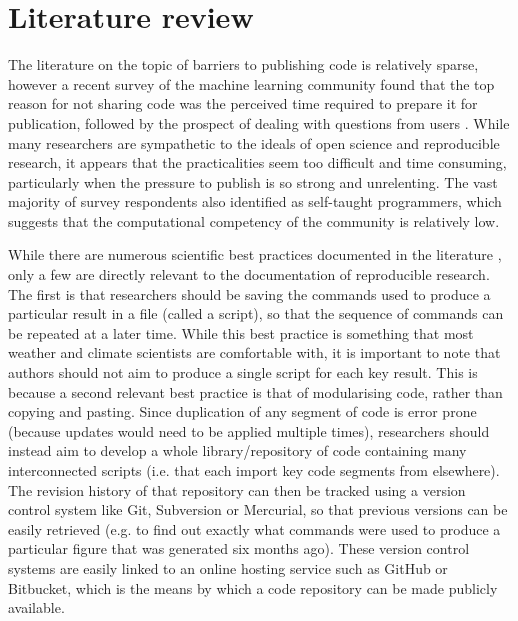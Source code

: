 
\section{Literature review}\label{s:reproducibility_review}

The literature on the topic of barriers to publishing code is relatively sparse, however a recent survey of the machine learning community found that the top reason for not sharing code was the perceived time required to prepare it for publication, followed by the prospect of dealing with questions from users \citep{Stodden2010}. While many researchers are sympathetic to the ideals of open science and reproducible research, it appears that the practicalities seem too difficult and time consuming, particularly when the pressure to publish is so strong and unrelenting. The vast majority of survey respondents also identified as self-taught programmers, which suggests that the computational competency of the community is relatively low. 

While there are numerous scientific best practices documented in the literature \citep[e.g.][]{Wilson2014a}, only a few are directly relevant to the documentation of reproducible research. The first is that researchers should be saving the commands used to produce a particular result in a file (called a script), so that the sequence of commands can be repeated at a later time. While this best practice is something that most weather and climate scientists are comfortable with, it is important to note that authors should not aim to produce a single script for each key result. This is because a second relevant best practice is that of modularising code, rather than copying and pasting. Since duplication of any segment of code is error prone (because updates would need to be applied multiple times), researchers should instead aim to develop a whole library/repository of code containing many interconnected scripts (i.e. that each import key code segments from elsewhere). The revision history of that repository can then be tracked using a version control system like Git, Subversion or Mercurial, so that previous versions can be easily retrieved (e.g. to find out exactly what commands were used to produce a particular figure that was generated six months ago). These version control systems are easily linked to an online hosting service such as GitHub or Bitbucket, which is the means by which a code repository can be made publicly available.

